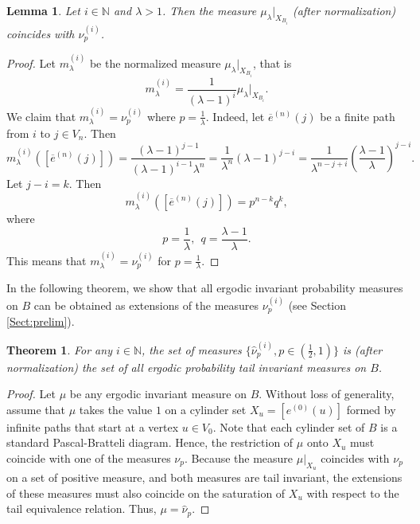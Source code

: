 \documentclass[11pt, twoside]{amsart}
\theoremstyle{definition}
\theoremstyle{remark}
\theoremstyle{plain}
\newtheorem{theorem}[definition]{Theorem}
\newtheorem{lemma}[definition]{Lemma}
\newcommand{\tcr}{\textcolor{red}}
\def\ov{\overline}
\def\wh{\widehat}
\numberwithin{equation}{section}
\begin{document}

\begin{lemma}
Let $i \in \mathbb{N}$ and $\lambda > 1$. Then the measure $\mu_{\lambda} |_{X_{B_i}}$ (after normalization) coincides with $\nu_p^{(i)}$.
\end{lemma}

\begin{proof}
    Let $m_{\lambda}^{(i)}$ be the normalized measure $\mu_{\lambda} |_{X_{B_i}}$, that is
    $$
    m_{\lambda}^{(i)} = \frac{1}{(\lambda - 1)^i}\mu_{\lambda} |_{X_{B_i}}.
    $$
    We claim that $m_{\lambda}^{(i)} = \nu_p^{(i)}$ where $p = \frac{1}{\lambda}$. Indeed, let $\ov e^{(n)}(j)$ be a finite path from $i$ to $j \in V_n$. Then
    $$
    m_{\lambda}^{(i)}([\ov e^{(n)}(j)]) = \frac{(\lambda - 1)^{j - 1}}{(\lambda - 1)^{i-1}\lambda^n} = \frac{1}{\lambda^n}(\lambda - 1)^{j - i} = \frac{1}{\lambda^{n - j + i}}\left(\frac{\lambda - 1}{\lambda}\right)^{j - i}.
    $$
    Let $j - i = k$. Then 
    $$
    m_{\lambda}^{(i)}([\ov e^{(n)}(j)]) = p^{n-k}q^k,
    $$
    where 
    $$
    p = \frac{1}{\lambda}, \ \ q = \frac{\lambda - 1}{\lambda}.
    $$
    This means that $m_{\lambda}^{(i)} = \nu_p^{(i)}$ for $p = \frac{1}{\lambda}$.
\end{proof}

In the following theorem, we show that all ergodic invariant probability measures on $B$ can be obtained as extensions of the measures $\nu_p^{(i)}$ (see Section \ref{Sect:prelim}).

\begin{theorem}\label{Thm:all_mu_on_GBD_Pascal}
    For any $i \in \mathbb{N}$, the set of measures $\{\wh \nu_p^{(i)}, p \in (\frac{1}{2},1)\}$ is (after normalization) the set of all ergodic probability tail invariant measures on $B$.
\end{theorem}

\begin{proof} 
Let $\mu$ be any ergodic invariant measure on $B$. Without loss of generality, assume that $\mu$ takes the value $1$ on a cylinder set $X_u =[e^{(0)}(u)]$ formed by infinite paths that start at a vertex $u \in V_0$. Note that each cylinder set of $B$ is a standard Pascal-Bratteli diagram. Hence, the restriction of $\mu$ onto $X_u$ must coincide with one of the measures $\nu_p$. Because the measure $\mu|_{X_u}$ coincides with 
$\nu_p$ on a set of positive measure, and both measures are tail invariant, the extensions of these measures must also 
coincide on the saturation of $X_u$ with respect to the tail equivalence relation. 
Thus, $\mu = \wh \nu_p$. 
\end{proof}
\end{document}
